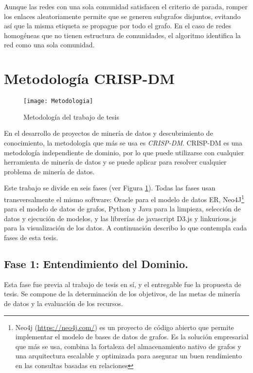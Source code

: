 Aunque las redes con una sola comunidad satisfacen el criterio de parada, romper los enlaces aleatoriamente permite que se generen subgrafos disjuntos, evitando así que la misma etiqueta se propague por todo el grafo. En el caso de redes homogéneas que no tienen estructura de comunidades, el algoritmo identifica la red como una sola comunidad.


\section{Metodología CRISP-DM}

\begin{figure}[ht]
\caption{Metodología del trabajo de tesis}
\label{fig:Metodologia}
\centering
\texttt{[image: Metodologia]}
\end{figure}

En el desarrollo de proyectos de minería de datos y descubrimiento de conocimiento, la metodología que más se usa es \textit{\acrshort{CRISP-DM}}. \acrshort{CRISP-DM} es una metodología independiente de dominio, por lo que puede utilizarse con cualquier herramienta de minería de datos y se puede aplicar para resolver cualquier problema de minería de datos.\cite{Marbn2009AModel}

Este trabajo se divide en seis fases (ver Figura \ref{fig:Metodologia}). Todas las fases usan transversalmente el mismo software: Oracle para el modelo de datos ER, Neo4J\footnote{Neo4j (\url{https://neo4j.com/}) es un proyecto de código abierto que permite implementar el modelo de bases de datos de grafos. Es la solución empresarial que más se usa\cite{SolidIT2019DB-EnginesDBMS}, combina la fortaleza del almacenamiento nativo de grafos y una arquitectura escalable y optimizada para asegurar un buen rendimiento en las consultas basadas en relaciones} para el modelo de datos de grafos, Python y Java para la limpieza, selección de datos y ejecución de modelos, y las librerías de javascript D3.js y linkurious.js para la visualización de los datos. 
A continuación describo lo que contempla cada fases de esta tesis.

\subsection{Fase 1: Entendimiento del Dominio.} Esta fase fue previa al trabajo de tesis en sí, y el entregable fue la propuesta de tesis. Se compone de la determinación de los objetivos, de las metas de minería de datos y la evaluación de los recursos.

